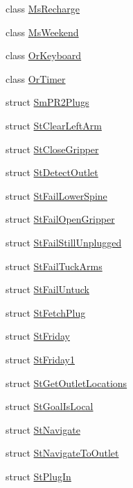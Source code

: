 \begin{DoxyCompactItemize}
\item 
class \hyperlink{classsm__pr2__plugs_1_1MsRecharge}{Ms\+Recharge}
\item 
class \hyperlink{classsm__pr2__plugs_1_1MsWeekend}{Ms\+Weekend}
\item 
class \hyperlink{classsm__pr2__plugs_1_1OrKeyboard}{Or\+Keyboard}
\item 
class \hyperlink{classsm__pr2__plugs_1_1OrTimer}{Or\+Timer}
\item 
struct \hyperlink{structsm__pr2__plugs_1_1SmPR2Plugs}{Sm\+P\+R2\+Plugs}
\item 
struct \hyperlink{structsm__pr2__plugs_1_1StClearLeftArm}{St\+Clear\+Left\+Arm}
\item 
struct \hyperlink{structsm__pr2__plugs_1_1StCloseGripper}{St\+Close\+Gripper}
\item 
struct \hyperlink{structsm__pr2__plugs_1_1StDetectOutlet}{St\+Detect\+Outlet}
\item 
struct \hyperlink{structsm__pr2__plugs_1_1StFailLowerSpine}{St\+Fail\+Lower\+Spine}
\item 
struct \hyperlink{structsm__pr2__plugs_1_1StFailOpenGripper}{St\+Fail\+Open\+Gripper}
\item 
struct \hyperlink{structsm__pr2__plugs_1_1StFailStillUnplugged}{St\+Fail\+Still\+Unplugged}
\item 
struct \hyperlink{structsm__pr2__plugs_1_1StFailTuckArms}{St\+Fail\+Tuck\+Arms}
\item 
struct \hyperlink{structsm__pr2__plugs_1_1StFailUntuck}{St\+Fail\+Untuck}
\item 
struct \hyperlink{structsm__pr2__plugs_1_1StFetchPlug}{St\+Fetch\+Plug}
\item 
struct \hyperlink{structsm__pr2__plugs_1_1StFriday}{St\+Friday}
\item 
struct \hyperlink{structsm__pr2__plugs_1_1StFriday1}{St\+Friday1}
\item 
struct \hyperlink{structsm__pr2__plugs_1_1StGetOutletLocations}{St\+Get\+Outlet\+Locations}
\item 
struct \hyperlink{structsm__pr2__plugs_1_1StGoalIsLocal}{St\+Goal\+Is\+Local}
\item 
struct \hyperlink{structsm__pr2__plugs_1_1StNavigate}{St\+Navigate}
\item 
struct \hyperlink{structsm__pr2__plugs_1_1StNavigateToOutlet}{St\+Navigate\+To\+Outlet}
\item 
struct \hyperlink{structsm__pr2__plugs_1_1StPlugIn}{St\+Plug\+In}

\end{DoxyCompactItemize}
